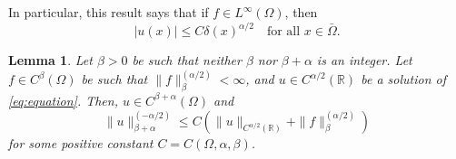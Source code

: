 \documentclass{amsart}
\newtheorem{lemma}[theorem]{Lemma}
\newtheorem{corollary}[theorem]{Corollary}
\theoremstyle{definition}
\theoremstyle{remark}
\numberwithin{equation}{section}
\begin{document}
In particular, this result says that if \(f\in L^\infty(\Omega)\), then
\begin{equation} \label{eq:reg-u-0}
  |u(x)| \le C \delta(x)^{\alpha/2} \quad \text{for all } x\in \bar{\Omega}.
\end{equation}

\begin{lemma}\cite[Proposition 1.4]{ROSOTON2014275} \label{lmm:regularity}
    Let \(\beta>0\) be such that neither \(\beta\) nor \(\beta+\alpha\) is an integer. Let \(f \in C^\beta (\Omega)\) be such that \( \|f\|_{\beta}^{(\alpha/2)} < \infty\), and \(u \in C^{\alpha/2} (\mathbb{R})\) be a solution of \eqref{eq:equation}. Then, \(u \in C^{\beta+\alpha} (\Omega)\) and
    \begin{equation*}
      \|u\|_{\beta+\alpha}^{(-\alpha/2)} \le C \left( \|u\|_{C^{\alpha/2}(\mathbb{R})} + \|f\|_{\beta}^{(\alpha/2)} \right)
    \end{equation*}
    for some positive constant \(C=C(\Omega, \alpha, \beta)\).
\end{lemma}

\end{document}
